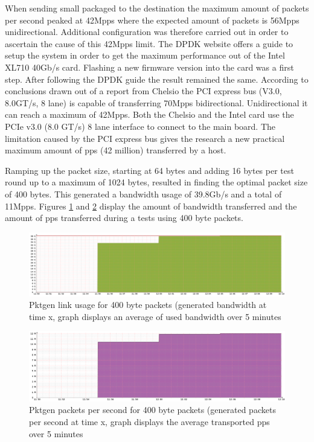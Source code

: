 When sending small packaged to the destination the maximum amount of packets per second peaked at 42Mpps where the expected amount of packets is 56Mpps unidirectional. 
Additional configuration was therefore carried out in order to ascertain the cause of this 42Mpps limit. 
The DPDK website offers a guide \cite{intelguidedpdk} to setup the system in order to get the maximum performance out of the Intel XL710 40Gb/s card. 
Flashing a new firmware version into the card was a first step. 
After following the DPDK guide the result remained the same. 
According to conclusions drawn out of a report from Chelsio \cite{chelsio} the PCI express bus (V3.0, 8.0GT/s, 8 lane) is capable of transferring 70Mpps bidirectional. 
Unidirectional it can reach a maximum of 42Mpps.
Both the Chelsio\cite{t580} and the Intel\cite{xl710} card use the PCIe v3.0 (8.0 GT/s) 8 lane interface to connect to the main board.
The limitation caused by the PCI express bus gives the research a new practical maximum amount of pps (42 million) transferred by a host.
   
Ramping up the packet size, starting at 64 bytes and adding 16 bytes per test round up to a maximum of 1024 bytes, resulted in finding the optimal packet size of 400 bytes. 
This generated a bandwidth usage of 39.8Gb/s and a total of 11Mpps. Figures \ref{fig:pktgenlink} and \ref{fig:pktgenpps} display the amount of bandwidth transferred and the amount of pps transferred during a tests using 400 byte packets. 

\begin{figure}
  \includegraphics[scale=0.35]{images/pktgen_link_usage.png}
  \caption{Pktgen link usage for 400 byte packets (generated bandwidth at time x, graph displays an average of used bandwidth over 5 minutes}
  \label{fig:pktgenlink}
\end{figure}

\begin{figure}
  \includegraphics[scale=0.35]{images/pktgen_pps.png}
  \caption{Pktgen packets per second for 400 byte packets (generated packets per second at time x, graph displays the average transported pps over 5 minutes}
  \label{fig:pktgenpps}
\end{figure}

